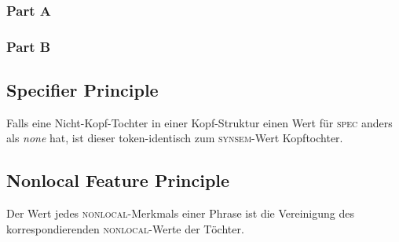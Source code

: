 \documentclass[10pt,a4paper]{article}
\begin{document}
\subsubsection{Part A}

 \scalebox{1}{%
\begin{avm}
  \[ synsem|loc|cont & \@1 \\
     hd-dtr|synsem|loc|cont & \@1
  \] 
\end{avm}}

\subsubsection{Part B}

 \scalebox{1}{%
  \begin{avm}
    \[ cont & \@1 \\
       non-hd-dtr|synsem|loc|cont & \@1
    \] 
\end{avm}}

\subsection{Specifier Principle}

Falls eine Nicht-Kopf-Tochter in einer Kopf-Struktur einen Wert für \textsc{spec} anders als \textit{none} hat, ist dieser token-identisch zum \textsc{synsem}-Wert Kopftochter.

\subsection{Nonlocal Feature Principle}

Der Wert jedes \textsc{nonlocal}-Merkmals einer Phrase ist die Vereinigung des korrespondierenden \textsc{nonlocal}-Werte der Töchter.
\end{document}
